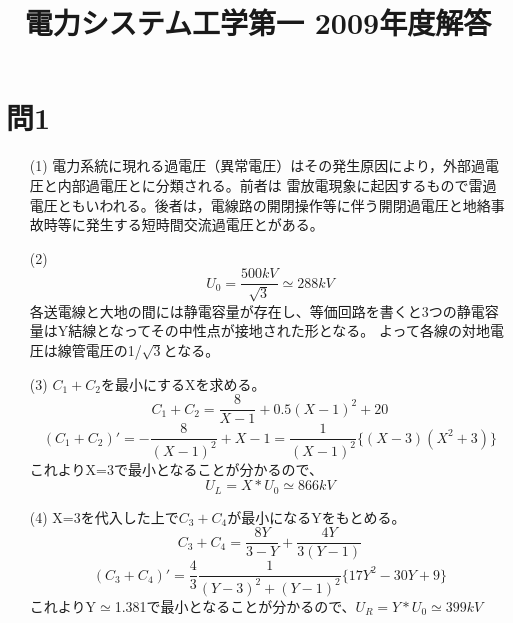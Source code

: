 \documentclass{jsarticle}
\title{電力システム工学第一 2009年度解答}
\begin{document}
\maketitle
\section{問1}
\begin{itemize}
 \item [(1)]電力系統に現れる過電圧（異常電圧）はその発生原因により，外部過電圧と内部過電圧とに分類される。前者は
雷放電現象に起因するもので雷過電圧ともいわれる。後者は，電線路の開閉操作等に伴う開閉過電圧と地絡事
故時等に発生する短時間交流過電圧とがある。
 \item [(2)]
\begin{equation}
 U_{0}=\frac{500kV}{\sqrt{3}}\simeq 288kV
\end{equation}
各送電線と大地の間には静電容量が存在し、等価回路を書くと3つの静電容量はY結線となってその中性点が接地された形となる。
よって各線の対地電圧は線管電圧の1/$\sqrt{3}$となる。
\item[(3)]
$C_{1}+C_{2}$を最小にするXを求める。
\begin{equation}
 C_{1}+C_{2}=\frac{8}{X-1}+0.5(X-1)^2+20
\end{equation}
\begin{equation}
(C_{1}+C_{2})'=-\frac{8}{(X-1)^2}+X-1=\frac{1}{(X-1)^2}\{(X-3)(X^2+3)\}
\end{equation}
これよりX=3で最小となることが分かるので、
\begin{equation}
 U_{L}=X*U_{0}\simeq 866kV
\end{equation}
\item[(4)]
X=3を代入した上で$C_{3}+C_{4}$が最小になるYをもとめる。
\begin{equation}
 C_{3}+C_{4}=\frac{8Y}{3-Y}+\frac{4Y}{3(Y-1)}
\end{equation}
\begin{equation}
 (C_{3}+C_{4})'=\frac{4}{3}\frac{1}{(Y-3)^2+(Y-1)^2}\{17Y^2-30Y+9\}
\end{equation}
これよりY$\simeq$1.381で最小となることが分かるので、$U_{R}=Y*U_{0}\simeq 399kV$
\end{itemize}
\end{document}
